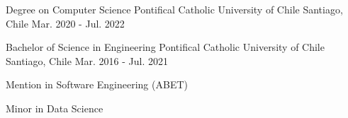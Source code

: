 

\begin{cventries}

  \cventry
  {Degree on Computer Science} %
  {Pontifical Catholic University of Chile} %
  {Santiago, Chile} %
  {Mar. 2020 - Jul. 2022} %
  {}

  \cventry
  {Bachelor of Science in Engineering} %
  {Pontifical Catholic University of Chile} %
  {Santiago, Chile} %
  {Mar. 2016 - Jul. 2021} %
  {
    \begin{cvitems} %
      \item {Mention in Software Engineering (ABET)}
      \item {Minor in Data Science}
    \end{cvitems}
  }

\end{cventries}
